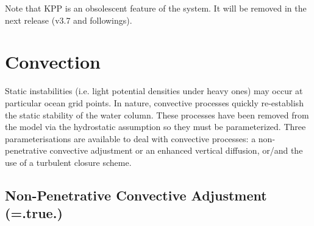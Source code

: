 \documentclass[NEMO_book]{subfiles}
\begin{document}
Note that KPP is an obsolescent feature of the \NEMO system. 
It will be removed in the next release (v3.7 and followings).


\section{Convection}
\label{ZDF_conv}


Static instabilities (i.e. light potential densities under heavy ones) may 
occur at particular ocean grid points. In nature, convective processes 
quickly re-establish the static stability of the water column. These 
processes have been removed from the model via the hydrostatic 
assumption so they must be parameterized. Three parameterisations 
are available to deal with convective processes: a non-penetrative 
convective adjustment or an enhanced vertical diffusion, or/and the 
use of a turbulent closure scheme.

\subsection   [Non-Penetrative Convective Adjustment (\np{ln\_tranpc}) ]
			{Non-Penetrative Convective Adjustment (=.true.) }
\label{ZDF_npc}

\end{document}
